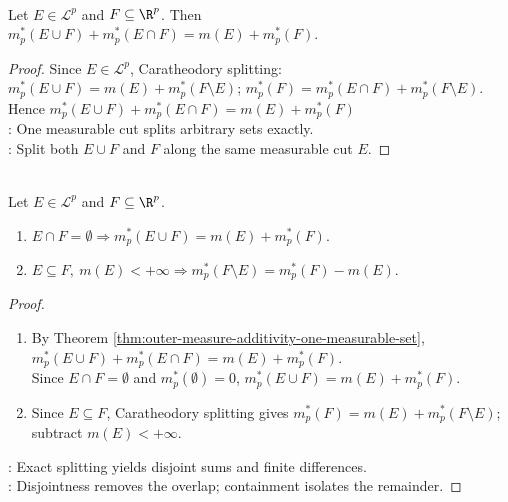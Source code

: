 \begin{theorem} \label{thm:outer-measure-additivity-one-measurable-set} \\
Let $E\in\mathcal{L}^p$ and $F\subseteq\R^p$. Then $m_p^\ast(E\cup F)+m_p^\ast(E\cap F)=m(E)+m_p^\ast(F)$.
\begin{proof} Since $E\in\mathcal{L}^p$, Caratheodory splitting: $m_p^\ast(E\cup F)=m(E)+m_p^\ast(F\setminus E)$; $m_p^\ast(F)=m_p^\ast(E\cap F)+m_p^\ast(F\setminus E)$.\\
Hence $m_p^\ast(E\cup F)+m_p^\ast(E\cap F)=m(E)+m_p^\ast(F)$\\
: One measurable cut splits arbitrary sets exactly.\\
: Split both $E\cup F$ and $F$ along the same measurable cut $E$.
\end{proof}
\end{theorem}

\begin{corollary} \label{cor:outer-measure-disjoint-union-and-difference} \\
Let $E\in\mathcal{L}^p$ and $F\subseteq\R^p$.
\begin{enumerate}[label=(\roman*)]
\setlength{\itemsep}{0pt}
\item $E\cap F=\emptyset\Longrightarrow m_p^\ast(E\cup F)=m(E)+m_p^\ast(F)$.
\item $E\subseteq F,\ m(E)<+\infty\Longrightarrow m_p^\ast(F\setminus E)=m_p^\ast(F)-m(E)$.
\end{enumerate}
\begin{proof}
\begin{enumerate}[label=(\roman*)]
\setlength{\itemsep}{0pt}
\item By Theorem \ref{thm:outer-measure-additivity-one-measurable-set}, $m_p^\ast(E\cup F)+m_p^\ast(E\cap F)=m(E)+m_p^\ast(F)$.\\
Since $E\cap F=\emptyset$ and $m_p^\ast(\emptyset)=0$, $m_p^\ast(E\cup F)=m(E)+m_p^\ast(F)$.
\item Since $E\subseteq F$, Caratheodory splitting gives $m_p^\ast(F)=m(E)+m_p^\ast(F\setminus E)$; subtract $m(E)<+\infty$.
\end{enumerate}
: Exact splitting yields disjoint sums and finite differences.\\
: Disjointness removes the overlap; containment isolates the remainder.
\end{proof}
\end{corollary}

